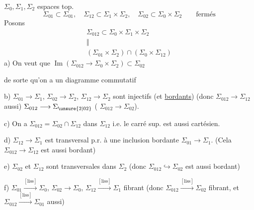 $\Sigma_0,\Sigma_1,\Sigma_2$ espaces top.
\[
\Sigma_{01}\subset\Sigma_{01},\quad
\Sigma_{12}\subset\Sigma_1\times\Sigma_2,\quad
\Sigma_{02}\subset\Sigma_0\times\Sigma_2\qquad\text{fermés}
\]
 Posons
\[
\begin{array}{c}
\Sigma_{012}\subset\Sigma_0\times\Sigma_1\times\Sigma_2\\
\Vert\\
(\Sigma_{01}\times\Sigma_2)\cap(\Sigma_0\times\Sigma_{12})
\end{array}
\]
a) On veut que $\operatorname{Im}(\Sigma_{012}\longrightarrow\Sigma_0\times\Sigma_2)\subset\Sigma_{02}$

de sorte qu'on a un diagramme commutatif

b) $\Sigma_{01}\longrightarrow\Sigma_1$, $\Sigma_{02}\longrightarrow\Sigma_2$, $\Sigma_{12}\longrightarrow\Sigma_2$ sont injectifs
(et \uline{bordants}) (donc $\Sigma_{012}\longrightarrow\Sigma_{12}$ aussi)
  $\Sigma_{012}\longrightarrow\Sigma_{\unsure{2|02}}$
  (\deleted{$\unsure{\Longleftrightarrow}$} $\Sigma_{012}\longrightarrow\Sigma_{02}$).

c) 
On a $\Sigma_{012}=\Sigma_{02}\cap\Sigma_{12}$ dans $\Sigma_{12}$ i.e.
le carré sup. est aussi cartésien.

d) $\Sigma_{12}\longrightarrow\Sigma_1$ est transversal p.r. à
une inclusion bordante $\Sigma_{01}\longrightarrow\Sigma_1$. (Cela 
$\Sigma_{012}\longrightarrow\Sigma_{12}$ est aussi bordant)

e) $\Sigma_{02}$ et $\Sigma_{12}$ sont  transversales dans $\Sigma_2$
(donc $\Sigma_{012}\hookrightarrow\Sigma_{02}$ est aussi bordant)

f) $\Sigma_{01}\xrightarrow{[\mathrm{liss}]}\Sigma_0$, $\Sigma_{02}\longrightarrow\Sigma_0$, $\Sigma_{12}\xrightarrow{[\mathrm{liss}]}\Sigma_1$ fibrant
(donc $\Sigma_{012}\xrightarrow{[\mathrm{liss}]}\Sigma_{02}$ fibrant,  et $\Sigma_{012}\xrightarrow{[\mathrm{liss}]}\Sigma_{01}$ aussi)

